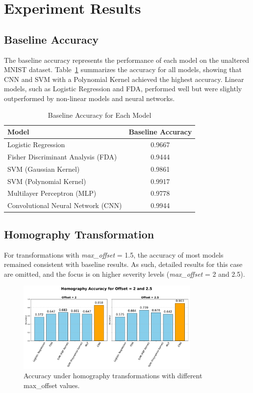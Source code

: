 \documentclass{article}
\begin{document}
\section{Experiment Results}

\subsection{Baseline Accuracy}
The baseline accuracy represents the performance of each model on the unaltered MNIST dataset. Table~\ref{tab:baseline_accuracy} summarizes the accuracy for all models, showing that CNN and SVM with a Polynomial Kernel achieved the highest accuracy. Linear models, such as Logistic Regression and FDA, performed well but were slightly outperformed by non-linear models and neural networks.

\begin{table}[h!]
    \centering
    \caption{Baseline Accuracy for Each Model}
    \label{tab:baseline_accuracy}
    \begin{tabular}{|l|c|}
        \hline
        \textbf{Model} & \textbf{Baseline Accuracy} \\ 
        \hline
        Logistic Regression & 0.9667 \\ 
        Fisher Discriminant Analysis (FDA) & 0.9444 \\ 
        SVM (Gaussian Kernel) & 0.9861 \\ 
        SVM (Polynomial Kernel) & 0.9917 \\ 
        Multilayer Perceptron (MLP) & 0.9778 \\ 
        Convolutional Neural Network (CNN) & 0.9944 \\ 
        \hline
    \end{tabular}
\end{table}

\subsection{Homography Transformation}
For transformations with \textit{max\_offset} = 1.5, the accuracy of most models remained consistent with baseline results. As such, detailed results for this case are omitted, and the focus is on higher severity levels (\textit{max\_offset} = 2 and 2.5). 

\begin{figure}[h!]
    \centering
    \includegraphics[width=0.8\textwidth]{images/homography.pdf}
    \caption{Accuracy under homography transformations with different max\_offset values.}
    \label{fig:homography_accuracy}
\end{figure}
\end{document}
